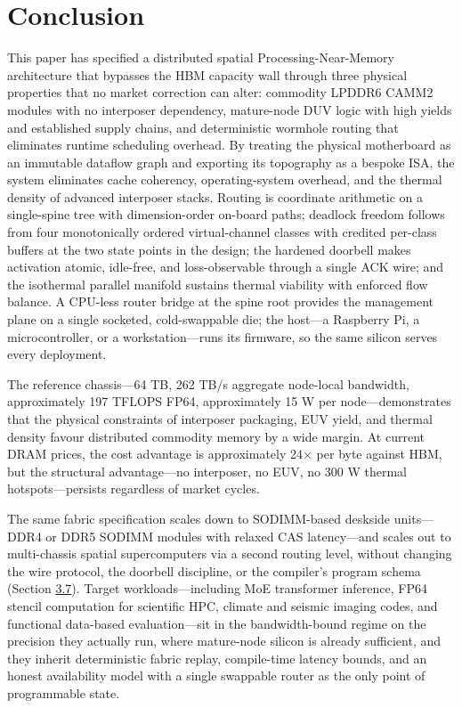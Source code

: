 \documentclass[10pt,twocolumn]{article}
\begin{document}
\section*{Conclusion}\label{sec:conclusion}

This paper has specified a distributed spatial Processing-Near-Memory architecture that bypasses the HBM capacity wall through three physical properties that no market correction can alter: commodity LPDDR6 CAMM2 modules with no interposer dependency\cite{16,17}, mature-node DUV logic with high yields and established supply chains, and deterministic wormhole routing that eliminates runtime scheduling overhead\cite{13,14}. By treating the physical motherboard as an immutable dataflow graph and exporting its topography as a bespoke ISA, the system eliminates cache coherency, operating-system overhead, and the thermal density of advanced interposer stacks. Routing is coordinate arithmetic on a single-spine tree with dimension-order on-board paths; deadlock freedom follows from four monotonically ordered virtual-channel classes with credited per-class buffers at the two state points in the design; the hardened doorbell makes activation atomic, idle-free, and loss-observable through a single ACK wire; and the isothermal parallel manifold sustains thermal viability with enforced flow balance. A CPU-less router bridge at the spine root provides the management plane on a single socketed, cold-swappable die; the host---a Raspberry Pi, a microcontroller, or a workstation---runs its firmware, so the same silicon serves every deployment.

The reference chassis---64 TB, 262 TB/s aggregate node-local bandwidth, approximately 197 TFLOPS FP64, approximately 15 W per node---demonstrates that the physical constraints of interposer packaging, EUV yield, and thermal density favour distributed commodity memory by a wide margin. At current DRAM prices, the cost advantage is approximately 24$\times$ per byte against HBM, but the structural advantage---no interposer, no EUV, no 300 W thermal hotspots---persists regardless of market cycles.

The same fabric specification scales down to SODIMM-based deskside units---DDR4 or DDR5 SODIMM modules with relaxed CAS latency---and scales out to multi-chassis spatial supercomputers via a second routing level, without changing the wire protocol, the doorbell discipline, or the compiler's program schema (Section \hyperref[sec:3.7]{3.7}). Target workloads---including MoE transformer inference, FP64 stencil computation for scientific HPC, climate and seismic imaging codes, and functional data-based evaluation---sit in the bandwidth-bound regime on the precision they actually run, where mature-node silicon is already sufficient\cite{3,4,5}, and they inherit deterministic fabric replay, compile-time latency bounds, and an honest availability model with a single swappable router as the only point of programmable state.
\end{document}
